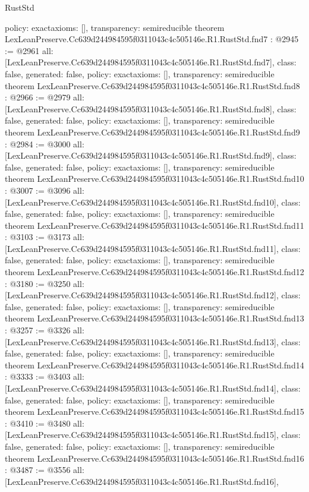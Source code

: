 \begin{lexlean}{RustStd}
\begin{coremodule}
{  policy: exact{axioms: []},
  transparency: semireducible
}
theorem LexLeanPreserve.Cc639d244984595f0311043c4c505146e.R1.RustStd.fnd7 : @2945 := @2961 {
  all: [LexLeanPreserve.Cc639d244984595f0311043c4c505146e.R1.RustStd.fnd7],
  class: false,
  generated: false,
  policy: exact{axioms: []},
  transparency: semireducible
}
theorem LexLeanPreserve.Cc639d244984595f0311043c4c505146e.R1.RustStd.fnd8 : @2966 := @2979 {
  all: [LexLeanPreserve.Cc639d244984595f0311043c4c505146e.R1.RustStd.fnd8],
  class: false,
  generated: false,
  policy: exact{axioms: []},
  transparency: semireducible
}
theorem LexLeanPreserve.Cc639d244984595f0311043c4c505146e.R1.RustStd.fnd9 : @2984 := @3000 {
  all: [LexLeanPreserve.Cc639d244984595f0311043c4c505146e.R1.RustStd.fnd9],
  class: false,
  generated: false,
  policy: exact{axioms: []},
  transparency: semireducible
}
theorem LexLeanPreserve.Cc639d244984595f0311043c4c505146e.R1.RustStd.fnd10 : @3007 := @3096 {
  all: [LexLeanPreserve.Cc639d244984595f0311043c4c505146e.R1.RustStd.fnd10],
  class: false,
  generated: false,
  policy: exact{axioms: []},
  transparency: semireducible
}
theorem LexLeanPreserve.Cc639d244984595f0311043c4c505146e.R1.RustStd.fnd11 : @3103 := @3173 {
  all: [LexLeanPreserve.Cc639d244984595f0311043c4c505146e.R1.RustStd.fnd11],
  class: false,
  generated: false,
  policy: exact{axioms: []},
  transparency: semireducible
}
theorem LexLeanPreserve.Cc639d244984595f0311043c4c505146e.R1.RustStd.fnd12 : @3180 := @3250 {
  all: [LexLeanPreserve.Cc639d244984595f0311043c4c505146e.R1.RustStd.fnd12],
  class: false,
  generated: false,
  policy: exact{axioms: []},
  transparency: semireducible
}
theorem LexLeanPreserve.Cc639d244984595f0311043c4c505146e.R1.RustStd.fnd13 : @3257 := @3326 {
  all: [LexLeanPreserve.Cc639d244984595f0311043c4c505146e.R1.RustStd.fnd13],
  class: false,
  generated: false,
  policy: exact{axioms: []},
  transparency: semireducible
}
theorem LexLeanPreserve.Cc639d244984595f0311043c4c505146e.R1.RustStd.fnd14 : @3333 := @3403 {
  all: [LexLeanPreserve.Cc639d244984595f0311043c4c505146e.R1.RustStd.fnd14],
  class: false,
  generated: false,
  policy: exact{axioms: []},
  transparency: semireducible
}
theorem LexLeanPreserve.Cc639d244984595f0311043c4c505146e.R1.RustStd.fnd15 : @3410 := @3480 {
  all: [LexLeanPreserve.Cc639d244984595f0311043c4c505146e.R1.RustStd.fnd15],
  class: false,
  generated: false,
  policy: exact{axioms: []},
  transparency: semireducible
}
theorem LexLeanPreserve.Cc639d244984595f0311043c4c505146e.R1.RustStd.fnd16 : @3487 := @3556 {
  all: [LexLeanPreserve.Cc639d244984595f0311043c4c505146e.R1.RustStd.fnd16],
}
\end{coremodule}
\end{lexlean}
